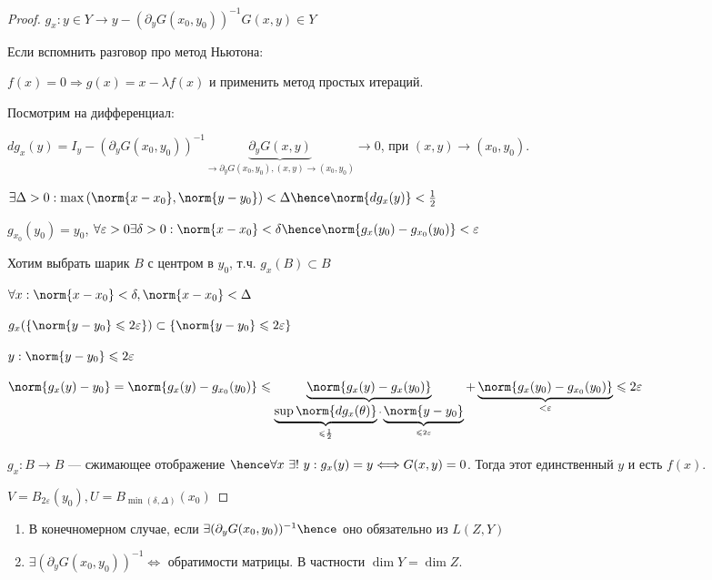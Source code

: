 \begin{proof}
    $g_x : y \in Y \to y - (\partial_y G(x_0, y_0)) ^ {-1} G(x, y) \in Y$

    Если вспомнить разговор про метод Ньютона:

    $f(x) = 0 \Rightarrow g(x) = x - \lambda f(x)$ и применить метод простых итераций.

    Посмотрим на дифференциал:

    $dg_x(y) = I_y - (\partial_y G(x_0, y_0)) ^ {-1} \underbrace{\partial_y G(x, y)}_ {\to \partial_y G(x_0, y_0), (x, y) \to (x_0, y_0) } \to 0$, при $(x, y) \to (x_0, y_0)$.

    $\exists \Delta > 0 : \max{(\norm{x - x_0} , \norm{y - y_0})} < \Delta \hence \norm{dg_x(y)} < \frac{1}{2}$

    $g_{x_0}(y_0) = y_0$, $\forall \varepsilon > 0 \exists \delta > 0 : \norm{x - x_0} < \delta \hence \norm{g_x(y_0) - g_{x_0}(y_0)} < \varepsilon$

    Хотим выбрать шарик $B$ с центром в $y_0$, т.ч. $g_x(B) \subset B$

    $\forall x : \norm{x - x_0} < \delta, \norm{x - x_0} < \Delta$

    $ g_x(\{ \norm{y - y_0} \leqslant 2 \varepsilon \}) \subset \{ \norm{y - y_0} \leqslant 2 \varepsilon \}$

    $y : \norm{y - y_0} \leqslant 2 \varepsilon$

    $\norm{g_x(y) - y_0} = \norm{g_x(y) - g_{x_0}(y_0)} \leqslant \underbrace{\norm{g_x(y) - g_x(y_0)}}_{\underbrace{\sup \norm{dg_x(\theta)}}_{\leqslant \frac{1}{2}} \cdot \underbrace{\norm{y - y_0}}_{\leqslant 2 \varepsilon}} + \underbrace{\norm{g_x(y_0) - g_{x_0}(y_0)}}_{< \varepsilon} \leqslant 2 \varepsilon$

    $g_x : B \to B$ --- сжимающее отображение $\hence \forall x\,\, \exists! \,\, y : g_x(y) = y \Longleftrightarrow G(x, y) = 0$. Тогда этот единственный $y$ и есть $f(x)$.

    $V = B_{2\varepsilon}(y_0), U = B_{\min(\delta, \Delta)}(x_0)$
\end{proof}

\begin{remark}
\quad
    \begin{enumerate}
        \item В конечномерном случае, если $\exists (\partial_y G(x_0, y_0))^ {-1} \hence $ оно обязательно из $L(Z, Y)$
        \item $\exists (\partial_y G(x_0, y_0))^{-1} \Longleftrightarrow $ обратимости матрицы. В частности $\dim Y = \dim Z$.
    \end{enumerate}
\end{remark}